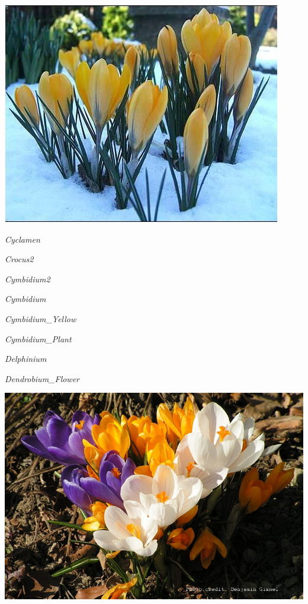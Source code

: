 \documentclass{article}
\begin{document}
\begin{center}
\includegraphics[height=0.9\textheight, angle=90]{../Crocus.jpg}
\end{center}
\newpage

\noindent
\vfill
\centerline{{\Large\emph{Cyclamen}}}
\vfill
\newpage

\noindent
\vfill
\centerline{{\Large\emph{Crocus2}}}
\vfill
\newpage

\noindent
\vfill
\centerline{{\Large\emph{Cymbidium2}}}
\vfill
\newpage

\noindent
\vfill
\centerline{{\Large\emph{Cymbidium}}}
\vfill
\newpage

\noindent
\vfill
\centerline{{\Large\emph{Cymbidium_Yellow}}}
\vfill
\newpage

\noindent
\vfill
\centerline{{\Large\emph{Cymbidium_Plant}}}
\vfill
\newpage

\noindent
\vfill
\centerline{{\Large\emph{Delphinium}}}
\vfill
\newpage

\noindent
\vfill
\centerline{{\Large\emph{Dendrobium_Flower}}}
\vfill
\newpage

\begin{center}
\includegraphics[height=0.9\textheight, angle=90]{../Crocus2.jpg}
\end{center}
\newpage
\end{document}
